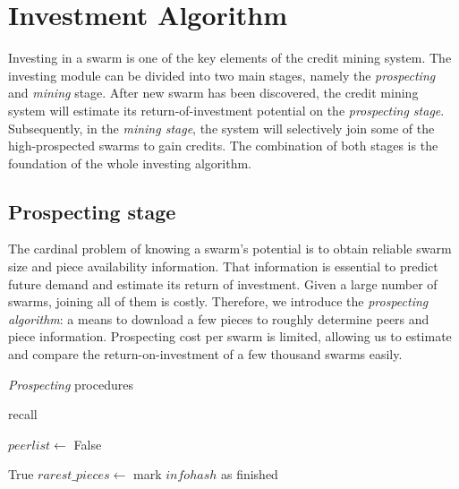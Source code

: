 \chapter{Investment Algorithm}
\label{chapter:prospection}
Investing in a swarm is one of the key elements of the credit mining system. The investing module can be divided into two main stages, namely the \textit{prospecting} and \textit{mining} stage. After new swarm has been discovered, the credit mining system will estimate its return-of-investment potential on the \textit{prospecting stage}. Subsequently, in the \textit{mining stage}, the system will selectively join some of the high-prospected swarms to gain credits. The combination of both stages is the foundation of the whole investing algorithm. 

\section{Prospecting stage}
The cardinal problem of knowing a swarm's potential is to obtain reliable swarm size and piece availability information. That information is essential to predict future demand and estimate its return of investment. Given a large number of swarms, joining all of them is costly. Therefore, we introduce the \textit{prospecting algorithm}: a means to download a few pieces to roughly determine peers and piece information. Prospecting cost per swarm is limited, allowing us to estimate and compare the return-on-investment of a few thousand swarms easily.

\begin{algorithm}[h!]
	\caption{\textit{Prospecting} procedures}
	\label{alg:prospectg}
	\begin{algorithmic}[1]
		\State recall 
		\EndIf
		\State {}
		\State {}
		\State {}
		\State \Return {}
		\EndFunction
		
		\State $peerlist \gets$ 
		\State {}
		\State {}
		\State \Return False
		\EndIf
		
		\State {}
		\State \Return True
		\EndIf
		\State $rarest\_pieces \gets$  \label{alg:prospectg:callrarepc}
			\State {}
		\EndFor
		\State mark $infohash$ as finished
		\EndIf
		\State \Return {}
		\EndFunction		
	\end{algorithmic}
\end{algorithm}

